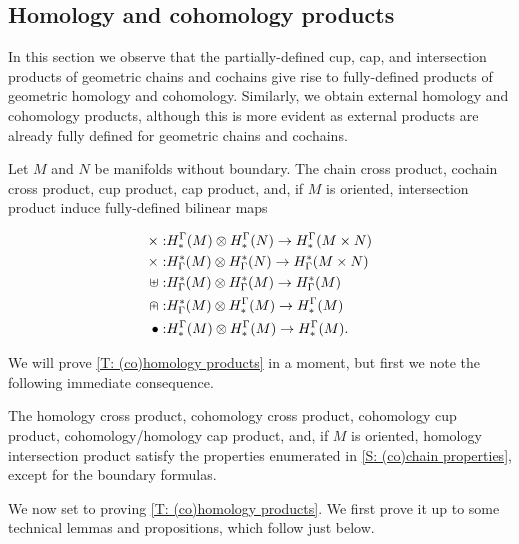 \subsection{Homology and cohomology products}\label{S: homology products}

In this section we observe that the partially-defined cup, cap, and intersection products of geometric chains and cochains give rise to fully-defined products of geometric homology and cohomology. Similarly, we obtain external homology and cohomology products, although this is more evident as external products are already fully defined for geometric chains and cochains.

\begin{theorem}\label{T: (co)homology products}
Let $M$ and $N$ be manifolds without boundary. The chain cross product, cochain cross product, cup product, cap product, and, if $M$ is oriented, intersection product induce fully-defined bilinear maps

\begin{align*}
\times:& H^\Gamma_*(M) \otimes H^\Gamma_*(N) \to H^\Gamma_*(M \times N)\\
\times:& H_\Gamma^*(M) \otimes H_\Gamma^*(N) \to H_\Gamma^*(M \times N)\\
\uplus:& H_\Gamma^*(M) \otimes H_\Gamma^*(M) \to H_\Gamma^*(M)\\
\nplus:& H_\Gamma^*(M) \otimes H^\Gamma_*(M) \to H^\Gamma_*(M)\\
\bullet:& H^\Gamma_*(M) \otimes H^\Gamma_*(M) \to H^\Gamma_*(M).\\
\end{align*}
\end{theorem}

We will prove \cref{T: (co)homology products} in a moment, but first we note the following immediate consequence.
\begin{theorem}
The homology cross product, cohomology cross product, cohomology cup product, cohomology/homology cap product, and, if $M$ is oriented, homology intersection product satisfy the properties enumerated in \cref{S: (co)chain properties}, except for the boundary formulas.
\end{theorem}



We now set to proving \cref{T: (co)homology products}. We first prove it up to some technical lemmas and propositions, which follow just below.


